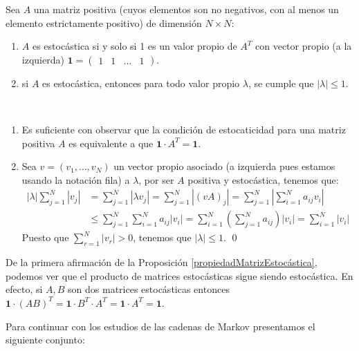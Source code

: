\begin{proposition}\label{propiedadMatrizEstocástica}
    
Sea $A$ una matriz positiva (cuyos elementos son no negativos, con al menos un elemento estrictamente positivo) de dimensión $N\times N$:
\begin{enumerate}
    \item $A$ es estocástica si y solo si 1 es un valor propio de $A^T$ con vector propio (a la izquierda) $\mathbf{1}=\begin{pmatrix}1 & 1 & \dots & 1\end{pmatrix}$.
    \item si $A$ es estocástica, entonces para todo valor propio $\lambda$, se cumple que  $\left|\lambda\right|\leq1.$
\end{enumerate}
\end{proposition}

\begin{proofs*}
\
\begin{enumerate}
    \item Es suficiente con observar que la condición de estocaticidad para una matriz positiva $A$ es equivalente a que $\mathbf{1}\cdot A^T=\mathbf{1}$.
    \item Sea $v=(v_1,\dots,v_N)$ un vector propio asociado (a izquierda pues estamos usando la notación fila) a $\lambda$, por ser $A$ positiva y estocástica, tenemos que:
    \[
    \begin{aligned}
        \left|\lambda\right|\sum_{j=1}^N\left| v_j\right|&=\sum_{j=1}^N\left|\lambda v_j\right|= \sum_{j=1}^N\left|(vA)_j \right|  =\sum_{j=1}^N\left|\sum_{i=1}^N a_{ij}v_i\right|\\
        &\leq\sum_{j=1}^N\sum_{i=1}^N a_{ij}\left|v_i\right|=\sum_{i=1}^N\left( \sum_{j=1}^N a_{ij} \right) \left|v_i\right|=\sum_{i=1}^N\left|v_i\right|    
    \end{aligned}
    \]
    Puesto que $\displaystyle\sum_{r=1}^N\left|v_r\right|>0$, tenemos que $\left|\lambda\right|\leq1$.    \qed
\end{enumerate}
\end{proofs*}

\begin{remark*}\label{productoEstocásticos}
De la primera afirmación de la Proposición \ref{propiedadMatrizEstocástica}, podemos ver que el producto de matrices estocásticas sigue siendo estocástica. En efecto, si $A, B$ son dos matrices estocásticas entonces $\mathbf{1}\cdot\left(AB\right)^T=\mathbf{1}\cdot B^T\cdot A^T=\mathbf{1}\cdot A^T=\mathbf{1}$.
\end{remark*}
Para continuar con los estudios de las cadenas de Markov presentamos el siguiente conjunto:

